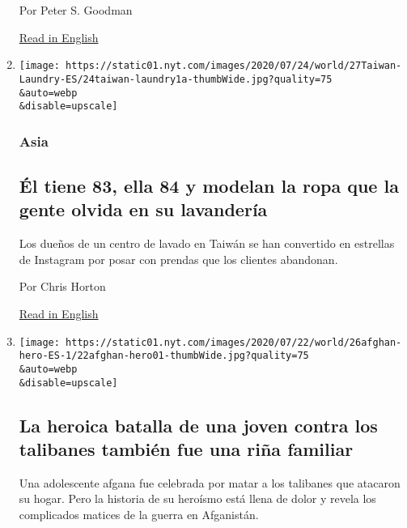 \begin{enumerate}
  Por Peter S. Goodman

  \href{https://www.nytimes.com/2020/07/27/business/global-remittances-coronavirus.html}{Read
  in English}
\item
  \href{/es/2020/07/28/espanol/mundo/lavanderia-taiwanesa-instagram.html}{}

  \texttt{[image: https://static01.nyt.com/images/2020/07/24/world/27Taiwan-Laundry-ES/24taiwan-laundry1a-thumbWide.jpg?quality=75\\\&auto=webp\\\&disable=upscale]}

  \hypertarget{asia-1}{%
  \subsubsection{Asia}\label{asia-1}}

  \hypertarget{uxe9l-tiene-83-ella-84-y-modelan-la-ropa-que-la-gente-olvida-en-su-lavanderuxeda}{%
  \subsection{Él tiene 83, ella 84 y modelan la ropa que la gente olvida
  en su
  lavandería}\label{uxe9l-tiene-83-ella-84-y-modelan-la-ropa-que-la-gente-olvida-en-su-lavanderuxeda}}

  Los dueños de un centro de lavado en Taiwán se han convertido en
  estrellas de Instagram por posar con prendas que los clientes
  abandonan.

  Por Chris Horton

  \href{https://www.nytimes.com/2020/07/24/world/asia/taiwan-octogenarian-couple-instagram-laundry.html}{Read
  in English}
\item
  \href{/es/2020/07/26/espanol/mundo/guerra-afganistan-mujeres.html}{}

  \texttt{[image: https://static01.nyt.com/images/2020/07/22/world/26afghan-hero-ES-1/22afghan-hero01-thumbWide.jpg?quality=75\\\&auto=webp\\\&disable=upscale]}

  \hypertarget{la-heroica-batalla-de-una-joven-contra-los-talibanes-tambiuxe9n-fue-una-riuxf1a-familiar}{%
  \subsection{La heroica batalla de una joven contra los talibanes
  también fue una riña
  familiar}\label{la-heroica-batalla-de-una-joven-contra-los-talibanes-tambiuxe9n-fue-una-riuxf1a-familiar}}

  Una adolescente afgana fue celebrada por matar a los talibanes que
  atacaron su hogar. Pero la historia de su heroísmo está llena de dolor
  y revela los complicados matices de la guerra en Afganistán.


\end{enumerate}
